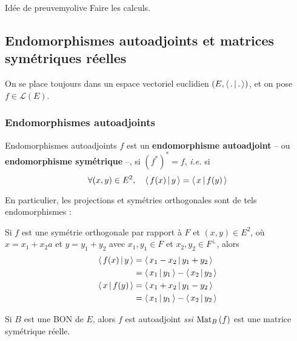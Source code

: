     \begin{demo}{Idée de preuve}{myolive}
        Faire les calculs.
    \end{demo}

\subsection{Endomorphismes autoadjoints et matrices symétriques réelles}

    On se place toujours dans un espace vectoriel euclidien $(E,\left<\,.\,\middle|\,.\,\right>)$, et on pose $f \in \mathcal{L}(E)$.

    \subsubsection{Endomorphismes autoadjoints}

    \begin{defi}{Endomorphismes autoadjoints}{}
        $f$ est un \textbf{endomorphisme autoadjoint} -- ou \textbf{endomorphisme symétrique} --, si $(f^*)^* = f$, \textit{i.e.} si 
        \[ \forall (x,y) \in E^2, \quad \left<\,f(x)\,\middle|\,y\,\right> = \left<\,x\,\middle|\,f(y)\,\right> \]   
    \end{defi}

    En particulier, les projections et symétries orthogonales sont de tels endomorphismes :

    Si $f$ est une symétrie orthogonale par rapport à $F$ et $(x,y) \in E^2$, où $x = x_1 + x_2a$ et $y = y_1 + y_2$ avec $x_1,y_1 \in F$ et $x_2, y_2 \in F^{\perp}$, alors \begin{align*}
        \left<\,f(x)\,\middle|\,y\,\right> &= \left<\,x_1 - x_2\,\middle|\,y_1 + y_2\,\right> \\
        &= \left<\,x_1\,\middle|\,y_1\,\right> - \left<\,x_2\,\middle|\,y_2\,\right> \\
        \left<\,x\,\middle|\,f(y)\,\right> &= \left<\,x_1 + x_2\,\middle|\,y_1 - y_2\,\right> \\
        &= \left<\,x_1\,\middle|\,y_1\,\right> - \left<\,x_2\,\middle|\,y_2\,\right> \\
    \end{align*}

    \begin{prop}{}{}
        Si $B$ est une BON de $E$, alors $f$ est autoadjoint \textit{ssi} $\text{Mat}_{B}\left(f\right)$ est une matrice symétrique réelle.
    \end{prop}

